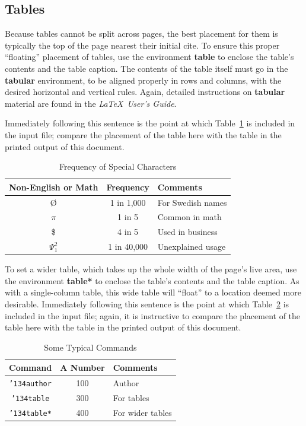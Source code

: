 \subsection{Tables}
Because tables cannot be split across pages, the best
placement for them is typically the top of the page
nearest their initial cite.  To
ensure this proper ``floating'' placement of tables, use the
environment \textbf{table} to enclose the table's contents and
the table caption.  The contents of the table itself must go
in the \textbf{tabular} environment, to
be aligned properly in rows and columns, with the desired
horizontal and vertical rules.  Again, detailed instructions
on \textbf{tabular} material
are found in the \textit{\LaTeX\ User's Guide}.

Immediately following this sentence is the point at which
Table~\ref{tab:freq} is included in the input file; compare the
placement of the table here with the table in the printed
output of this document.

\begin{table}
	\caption{Frequency of Special Characters}
	\label{tab:freq}
	\begin{tabular}{ccl}
		\toprule
		Non-English or Math&Frequency&Comments\\
		\midrule
		\O & 1 in 1,000& For Swedish names\\
		$\pi$ & 1 in 5& Common in math\\
		\$ & 4 in 5 & Used in business\\
		$\Psi^2_1$ & 1 in 40,000& Unexplained usage\\
		\bottomrule
	\end{tabular}
\end{table}

To set a wider table, which takes up the whole width of the page's
live area, use the environment \textbf{table*} to enclose the table's
contents and the table caption.  As with a single-column table, this
wide table will ``float'' to a location deemed more desirable.
Immediately following this sentence is the point at which
Table~\ref{tab:commands} is included in the input file; again, it is
instructive to compare the placement of the table here with the table
in the printed output of this document.


\begin{table}
	\caption{Some Typical Commands}
	\label{tab:commands}
	\begin{tabular}{ccl}
		\toprule
		Command &A Number & Comments\\
		\midrule
		\texttt{{\char'134}author} & 100& Author \\
		\texttt{{\char'134}table}& 300 & For tables\\
		\texttt{{\char'134}table*}& 400& For wider tables\\
		\bottomrule
	\end{tabular}
\end{table}

